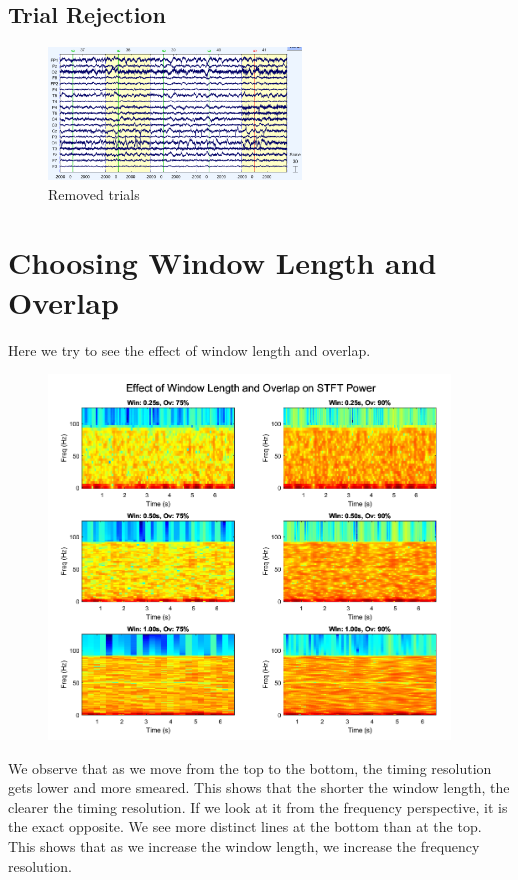 \documentclass[hidelinks,12pt]{article}
\begin{document}
	\subsection{Trial Rejection}
	\begin{figure}[h!]
		\centering
		\includegraphics[width=0.6\textwidth]{41}
		\caption{Removed trials}
	\end{figure}
	
	\newpage
	
	\section{Choosing Window Length and Overlap}
	Here we try to see the effect of window length and overlap.
	\begin{figure}[h!]
		\centering
		\includegraphics[width=0.95\textwidth]{42}
		\caption{}
	\end{figure}
	
	We observe that as we move from the top to the bottom, the timing resolution gets lower and more smeared. This shows that the shorter the window length, the clearer the timing resolution. If we look at it from the frequency perspective, it is the exact opposite. We see more distinct lines at the bottom than at the top. This shows that as we increase the window length, we increase the frequency resolution.
	
\end{document}
